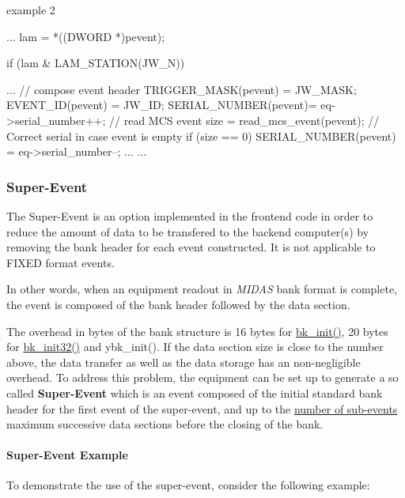 \begin{DoxyItemize}
\item example 2
\end{DoxyItemize}


\begin{DoxyCode}
  ...
  lam = *((DWORD *)pevent);

  if (lam & LAM_STATION(JW_N))

  {
    ...
    // compose event header
    TRIGGER_MASK(pevent) = JW_MASK;
    EVENT_ID(pevent)     = JW_ID;
    SERIAL_NUMBER(pevent)= eq->serial_number++;
    // read MCS event
    size = read_mcs_event(pevent);
    // Correct serial in case event is empty 
    if (size == 0)
      SERIAL_NUMBER(pevent) = eq->serial_number--;
    ...
  }
  ...
\end{DoxyCode}




 \par




\par
 \label{index_end}
\hypertarget{index_end}{}
 \subsubsection{Super-\/Event}\label{FE_Super_Event}
\par
 

\par
 \label{FE_Super_Event_idx_event_readout_super-event}
\hypertarget{FE_Super_Event_idx_event_readout_super-event}{}
 \label{FE_Super_Event_idx_super-event}
\hypertarget{FE_Super_Event_idx_super-event}{}


The Super-\/Event is an option implemented in the frontend code in order to reduce the amount of data to be transfered to the backend computer(s) by removing the bank header for each event constructed. It is not applicable to FIXED format events.

In other words, when an equipment readout in {\itshape MIDAS\/} bank format is complete, the event is composed of the bank header followed by the data section.

The overhead in bytes of the bank structure is 16 bytes for \hyperlink{group__bkfunctionc_gac6fadde40824dbf7bd70abedd29be2bd}{bk\_\-init()}, 20 bytes for \hyperlink{group__bkfunctionc_gae7cbf587db63fcdf66dd18b29f08b6d2}{bk\_\-init32()} and ybk\_\-init(). If the data section size is close to the number above, the data transfer as well as the data storage has an non-\/negligible overhead. To address this problem, the equipment can be set up to generate a so called {\bfseries  Super-\/Event } which is an event composed of the initial standard bank header for the first event of the super-\/event, and up to the \hyperlink{FE_table_FE_tbl_NumSubevents}{number of sub-\/events} maximum successive data sections before the closing of the bank.\hypertarget{FE_Super_Event_FE_Super_Event_example}{}\paragraph{Super-\/Event Example}\label{FE_Super_Event_FE_Super_Event_example}
To demonstrate the use of the super-\/event, consider the following example:


